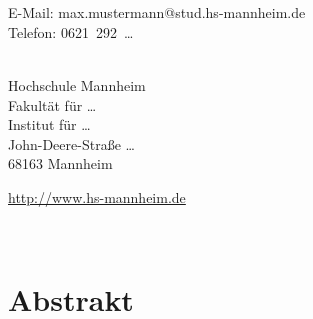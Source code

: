 
\maketitle

\newpage
\begin{fullwidth}
	~\vfill
	\thispagestyle{empty}
	\setlength{\parindent}{0pt}
	\setlength{\parskip}{\baselineskip}

	\par{} \\
	E-Mail: max.mustermann@stud.hs-mannheim.de \\
	Telefon: 0621~292~\dots

	\par{} \\
	Hochschule Mannheim \\
	Fakultät für \dots \\
	Institut für \dots \\
	John-Deere-Straße \dots \\
	68163 Mannheim

	\par\url{http://www.hs-mannheim.de}
\end{fullwidth}

\tableofcontents
\listoffigures
\listoftables

\cleardoublepage
~\vfill
\begin{doublespace}
\noindent\fontsize{18}{22}\selectfont\itshape
\nohyphenation
\lipsum[1]
\end{doublespace}
\vfill
\vfill

\cleardoublepage
\chapter*{Abstrakt}
\lipsum[1]